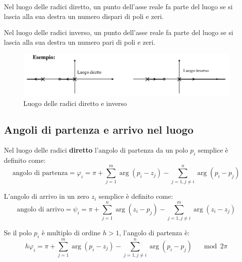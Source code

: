 \begin{definition}[Proprietà 3]
  Nel luogo delle radici diretto, un punto dell'asse reale fa parte del luogo 
  se si lascia alla sua destra un numero dispari di poli e zeri.

  Nel luogo delle radici inverso, un punto dell'asse reale fa parte del luogo 
  se si lascia alla sua destra un numero pari di poli e zeri.
\end{definition}


\begin{figure}[h!]
  \centering
  \includegraphics[width=0.8\linewidth]{./images/luogo_diretto_inverso.png}
  \caption{Luogo delle radici diretto e inverso}
  \label{fig:luogo_diretto_inverso}
\end{figure}



\subsection{Angoli di partenza e arrivo nel luogo}

\begin{definition}[Proprietà 4]
  Nel luogo delle radici \textbf{diretto} l'angolo di partenza da un polo $p_i$ semplice
  è definito come:
  \begin{equation}
    \text{angolo di partenza} = \varphi_i = \pi + \sum_{j=1}^m \arg (p_i - z_j) - \sum_{j=1, j\neq i}^n \arg (p_i - p_j)
  \end{equation}

  L'angolo di arrivo in un zero $z_i$ semplice è definito come:
  \begin{equation}
    \text{angolo di arrivo} = \psi_i = \pi + \sum_{j=1}^n \arg (z_i - p_j) - \sum_{j=1, j\neq i}^m \arg (z_i - z_j)
  \end{equation}
\end{definition}



Se il polo $p_i$ è multiplo di ordine $h > 1$, l'angolo di partenza è:
\begin{equation}
  h \varphi_i = \pi + \sum_{j=1}^m \arg (p_i - z_j) - \sum_{j=1, j\neq i}^n \arg (p_i - p_j) \quad \mod 2\pi
\end{equation}

